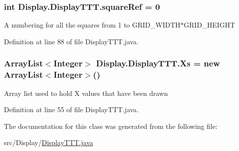 \subsubsection[{square\+Ref}]{\setlength{\rightskip}{0pt plus 5cm}int Display.\+Display\+T\+T\+T.\+square\+Ref = 0\hspace{0.3cm}{\ttfamily [private]}}\label{class_display_1_1_display_t_t_t_a72b67bc50aa6ba47ae9d398e597c49bb}
A numbering for all the squares from 1 to G\+R\+I\+D\+\_\+\+W\+I\+D\+T\+H$\ast$\+G\+R\+I\+D\+\_\+\+H\+E\+I\+G\+H\+T 

Definition at line 88 of file Display\+T\+T\+T.\+java.

\hypertarget{class_display_1_1_display_t_t_t_a7dc4fccda99b958bd1dead1dc6543442}{}
\subsubsection[{Xs}]{\setlength{\rightskip}{0pt plus 5cm}Array\+List$<$Integer$>$ Display.\+Display\+T\+T\+T.\+Xs = new Array\+List$<$Integer$>$()\hspace{0.3cm}{\ttfamily [private]}}\label{class_display_1_1_display_t_t_t_a7dc4fccda99b958bd1dead1dc6543442}
Array list used to hold X values that have been drawn 

Definition at line 55 of file Display\+T\+T\+T.\+java.



The documentation for this class was generated from the following file\+:\begin{DoxyCompactItemize}
\item 
src/\+Display/\hyperlink{_display_t_t_t_8java}{Display\+T\+T\+T.\+java}\end{DoxyCompactItemize}
